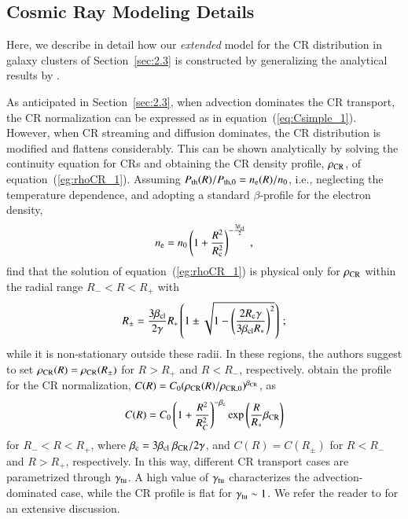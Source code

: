 \documentclass[useAMS,usenatbib]{mn2e}
\begin{document}




\begin{appendix}

\section{Cosmic Ray Modeling Details}
\label{app:B}

Here, we describe in detail how our \emph{extended} model for the CR distribution
in galaxy clusters of Section~\ref{sec:2.3} is constructed by generalizing the
analytical results by \cite{2011A&A...527A..99E}.

As anticipated in Section~\ref{sec:2.3}, when advection dominates the CR
transport, the CR normalization can be expressed as in
equation~(\ref{eq:Csimple_1}). However, when CR streaming and diffusion
dominates, the CR distribution is modified and flattens considerably. This can
be shown analytically by solving the continuity equation for CRs and obtaining
the CR density profile, $\rho_{{\mathrm{CR}}}$, of
equation~(\ref{eg:rhoCR_1}). Assuming $P_{{\mathrm{th}}}(R)/P_{{\mathrm{th}},0}=n_{{\mathrm{e}}}(R)/n_{0}$, i.e.,
neglecting the temperature dependence, and adopting a standard $\beta$-profile
for the electron density,
%
\begin{equation}
n_{{\mathrm{e}}} = n_{0} \left( 1+\frac{R^{2}}{R_{{\mathrm{c}}}^{2}} \right)^{-\frac{3\beta_{{\mathrm{cl}}}}{2}} \, ,
\label{eq:beta_profile}
\end{equation}
% 
\cite{2011A&A...527A..99E} find that the solution of equation~(\ref{eg:rhoCR_1}) is physical only 
for $\rho_{{\mathrm{CR}}}$ within the radial range $R_{-} < R < R_{+}$ with
%
\begin{equation}
R_{\pm} = \frac{3\beta_{{\mathrm{cl}}}}{2\gamma}R_{*}\left(1\pm\sqrt{1-\left(\frac{2R_{{\mathrm{c}}}\gamma}{3\beta_{{\mathrm{cl}}}R_{*}}\right)^{2}}\right) \, ;
\label{eq:Rpm}
\end{equation} 
%
while it is non-stationary outside these radii. In these regions, the authors
suggest to set $\rho_{{\mathrm{CR}}}(R) = \rho_{\rm{CR}}(R_{\pm})$ for $R > R_{+}$
and $R < R_{-}$, respectively. \cite{2011A&A...527A..99E} obtain the profile for
the CR normalization,
$C(R)=C_{0}(\rho_{{\mathrm{CR}}}(R)/\rho_{{\mathrm{CR}},0})^{\beta_{{\mathrm{CR}}}}$, as
%
\begin{equation}
C(R) = C_{0}\left( 1+ \frac{R^{2}}{R_{C}^{2}} \right)^{-\beta_{{\mathrm{c}}}} {\mathrm{exp}}\left( {\frac{R}{R_{*}}\beta_{{\mathrm{CR}}}} \right)
\label{eq:Ctransport}
\end{equation} 
%
for $R_{-}<R<R_{+}$, where
$\beta_{{\mathrm{c}}}=3\beta_{{\mathrm{cl}}}~\beta_{{\mathrm{CR}}}/2\gamma$, and $C(R) =
C(R_{\pm})$ for $R<R_{-}$ and $R>R_{+}$, respectively. In this way, different CR
transport cases are parametrized through $\gamma_{{\mathrm{tu}}}$.  A high value of
$\gamma_{{\mathrm{tu}}}$ characterizes the advection-dominated case, while the CR
profile is flat for $\gamma_{{\mathrm{tu}}} \sim1$. We refer the reader to
\cite{2011A&A...527A..99E} for an extensive discussion.


\end{appendix}
\end{document}
